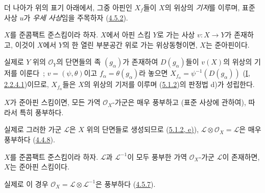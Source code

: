더 나아가 위의 표기 아래에서, 그중 아핀인 $X_f$들이 $X$의 위상의
\emph{기저}를 이루며, 표준 사상 $u$가 \emph{우세 사상}임을 주목하자
(\hyperref[II.4.5.2-ko]{4.5.2}).

\begin{corollary}[5.1.3]
\label{II.5.1.3-ko}
$X$를 준콤팩트 준스킴이라 하자. $X$에서 아핀 스킴 $Y$로 가는 사상
$v:X\to Y$가 존재하고, 이것이 $X$에서 $Y$의 한 열린 부분공간 위로
가는 위상동형이면, $X$는 준아핀이다.
\end{corollary}

실제로 $Y$ 위의 $\mathcal{O}_Y$의 단면들의 족 $(g_\alpha)$가 존재하여
$D(g_\alpha)$들이 $v(X)$의 위상의 기저를 이룬다~; $v=(\psi,\theta)$이고
$f_\alpha=\theta(g_\alpha)$라 놓으면
$X_{f_\alpha}=\psi^{-1}(D(g_\alpha))$
(\hyperref[I.2.2.4.1-ko]{I, 2.2.4.1})이므로, $X_{f_\alpha}$들은 $X$의
위상의 기저를 이루며 (\hyperref[II.5.1.2-ko]{5.1.2})의 판정법 d)가
성립한다.

\begin{corollary}[5.1.4]
\label{II.5.1.4-ko}
$X$가 준아핀 스킴이면, 모든 가역 $\mathcal{O}_X$-가군은 매우 풍부하고
(표준 사상에 관하여), 따라서 특히 풍부하다.
\end{corollary}

실제로 그러한 가군 $\mathcal{L}$은 $X$ 위의 단면들로 생성되므로
(\hyperref[II.5.1.2-ko]{5.1.2, e)}),
$\mathcal{L}\otimes\mathcal{O}_X=\mathcal{L}$은 매우 풍부하다
(\hyperref[II.4.4.8-ko]{4.4.8}).

\begin{corollary}[5.1.5]
\label{II.5.1.5-ko}
$X$를 준콤팩트 준스킴이라 하자. $\mathcal{L}$과
$\mathcal{L}^{-1}$이 모두 풍부한 가역 $\mathcal{O}_X$-가군
$\mathcal{L}$이 존재하면, $X$는 준아핀 스킴이다.
\end{corollary}

실제로 이 경우 $\mathcal{O}_X=\mathcal{L}\otimes\mathcal{L}^{-1}$은
풍부하다 (\hyperref[II.4.5.7-ko]{4.5.7}).

